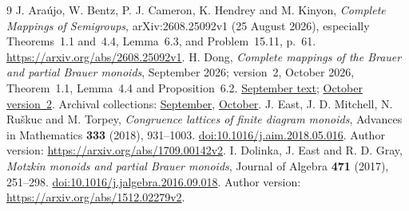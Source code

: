 \documentclass[11pt,a4paper]{article}
\begin{document}
\begin{thebibliography}{9}
 J. Ara\'ujo, W. Bentz, P. J. Cameron, K. Hendrey and M. Kinyon, \emph{Complete Mappings of Semigroups}, arXiv:2608.25092v1 (25 August 2026), especially Theorems~1.1 and~4.4, Lemma~6.3, and Problem~15.11, p.~61. \url{https://arxiv.org/abs/2608.25092v1}.
 H. Dong, \emph{Complete mappings of the Brauer and partial Brauer monoids}, September 2026; version~2, October 2026, Theorem~1.1, Lemma~4.4 and Proposition~6.2. \href{https://github.com/Horace-Maxwell/ai4math-results/blob/1342597dde7e3d424c88f0524dc2e6347670e6ad/papers/brauer-complete-mappings/note.pdf}{September text}; \href{https://github.com/Horace-Maxwell/ai4math-results/blob/a9c15a2d3bd9974a9bde05ca278fdcc2e28d8f5a/papers/brauer-complete-mappings/note.pdf}{October version~2}. Archival collections: \href{https://doi.org/10.5281/zenodo.22981669}{September}, \href{https://doi.org/10.5281/zenodo.23200924}{October}.
 J. East, J. D. Mitchell, N. Ru\v skuc and M. Torpey, \emph{Congruence lattices of finite diagram monoids}, Advances in Mathematics \textbf{333} (2018), 931--1003. \href{https://doi.org/10.1016/j.aim.2018.05.016}{doi:10.1016/j.aim.2018.05.016}. Author version: \url{https://arxiv.org/abs/1709.00142v2}.
 I. Dolinka, J. East and R. D. Gray, \emph{Motzkin monoids and partial Brauer monoids}, Journal of Algebra \textbf{471} (2017), 251--298. \href{https://doi.org/10.1016/j.jalgebra.2016.09.018}{doi:10.1016/j.jalgebra.2016.09.018}. Author version: \url{https://arxiv.org/abs/1512.02279v2}.
\end{thebibliography}
\end{document}
